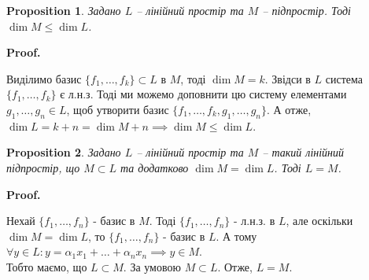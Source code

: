 \documentclass[a4paper, 10pt]{article}
\makeatletter
\theoremstyle{theoremdd}
\newtheorem{theorem}{Theorem}[subsection]
\newtheorem{proposition}[theorem]{Proposition}
\renewenvironment{proof}[1][Proof.\\]{\par
\pushQED{\hfill \qed}%
\normalfont \topsep6\p@\@plus6\p@\relax
\trivlist
\item\relax
{\bfseries
#1\@addpunct{.}}\hspace\labelsep\ignorespaces
}{%
\popQED\endtrivlist\@endpefalse
}
\makeatother
\begin{document}
	\begin{proposition}
	Задано $L$ -- лінійний простір та $M$ -- підпростір. Тоді $\dim M \leq \dim L$.
	\end{proposition}
	
	\begin{proof}
	Виділимо базис $\{f_1,\dots,f_k\} \subset L$ в $M$, тоді $\dim M = k$. Звідси в $L$ система $\{f_1,\dots,f_k\}$ є л.н.з. Тоді ми можемо доповнити цю систему елементами $g_1,\dots,g_n \in L$, щоб утворити базис $\{f_1,\dots,f_k,g_1,\dots,g_n\}$. А отже, $\dim L = k+n = \dim M + n \implies \dim M \leq \dim L$.
	\end{proof}
	
	\begin{proposition}
	\label{about_same_dim_prp}
	Задано $L$ -- лінійний простір та $M$ -- такий лінійний підпростір, що $M \subset L$ та додатково $\dim M = \dim L$. Тоді $L=M$.
	\end{proposition}
	
	\begin{proof}
	Нехай $\{f_1,\dots,f_n\}$ - базис в $M$. Тоді $\{f_1,\dots,f_n\}$ - л.н.з. в $L$, але оскільки $\dim M = \dim L$, то $\{f_1,\dots,f_n\}$ - базис в $L$. А тому $\forall y \in L: y = \alpha_1 x_1 + \dots + \alpha_n x_n \implies y \in M$.\\
	Тобто маємо, що $L \subset M$. За умовою $M \subset L$. Отже, $L=M$.
	\end{proof}
	
	\iffalse
	\begin{theorem}
	Задано $L$ - лінійний простір. Тоді будь-яка л.н.з. система може бути розширена до базиса $L$.
	\end{theorem}
	
	\begin{proof}
	Нехай $\{x_1,\dots,x_t\}$ - якась л.н.з. система. Є два варіанти:\\
	- уже max л.н.з. - тоді автоматично базис;\\
	- ще не max л.н.з.\\
	У другому випадку можна знайти елемент $x_{t+1}$, щоб система $\{x_1,\dots,x_t,x_{t+1}\}$ була л.н.з. Є знову два варіанти:\\
	- уже max л.н.з. - тоді автоматично базис;\\
	- ще не max л.н.з.\\
	У другому випадку можна знайти елемент $x_{t+2}$, щоб система $\{x_1,\dots,x_t,x_{t+2}\}$ була л.н.з.\\
	\vdots \\
	Продовжуючи ці кроки, рано чи пізно ми закінчимо додавати елементи в силу того, що $L$ - скінченно вимірний.
	\end{proof}
	\fi
	
\end{document}
